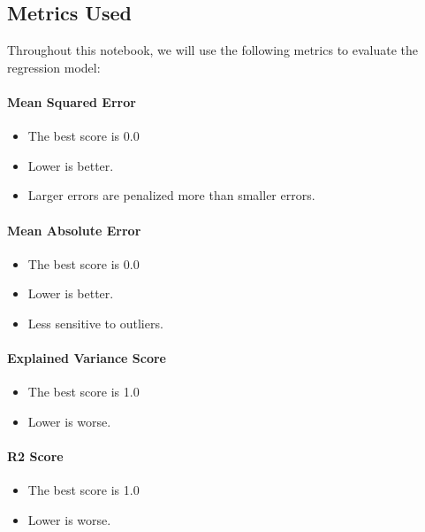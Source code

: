 \documentclass[11pt]{article}
\providecommand{\tightlist}{%
      \setlength{\itemsep}{0pt}\setlength{\parskip}{0pt}}
\begin{document}
    \subsection{Metrics Used}\label{metrics-used}

Throughout this notebook, we will use the following metrics to evaluate
the regression model:

\paragraph{Mean Squared Error}\label{mean-squared-error}

\begin{itemize}
\tightlist
\item
  The best score is 0.0
\item
  Lower is better.
\item
  Larger errors are penalized more than smaller errors.
\end{itemize}

\paragraph{Mean Absolute Error}\label{mean-absolute-error}

\begin{itemize}
\tightlist
\item
  The best score is 0.0
\item
  Lower is better.
\item
  Less sensitive to outliers.
\end{itemize}

\paragraph{Explained Variance Score}\label{explained-variance-score}

\begin{itemize}
\tightlist
\item
  The best score is 1.0
\item
  Lower is worse.
\end{itemize}

\paragraph{R2 Score}\label{r2-score}

\begin{itemize}
\tightlist
\item
  The best score is 1.0
\item
  Lower is worse.
\end{itemize}
\end{document}
